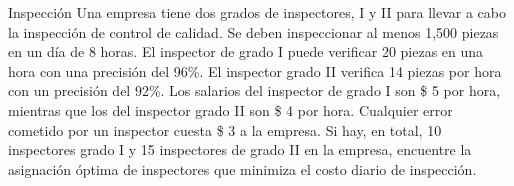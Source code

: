 \begin{frameExample}{Inspección}{}
Una empresa tiene dos grados de inspectores, I y II para llevar a cabo la inspección de control de calidad. Se deben inspeccionar al menos 1,500 piezas en un día de 8 horas. El inspector de grado I puede \alert{verificar 20 piezas en una hora} con una precisión del 96\%. El inspector grado II  \alert{verifica 14 piezas por hora} con un precisión del 92\%. Los salarios del inspector de grado I son \$ 5 por hora, mientras que los del inspector grado II  son \$ 4 por hora. Cualquier \alert{error} cometido por un inspector \alert{cuesta \$ 3 a la empresa}. Si hay, en total, 10 inspectores grado I
 y 15 inspectores de grado II en la empresa, encuentre la asignación óptima de inspectores que minimiza el costo diario de inspección.
    
\end{frameExample}



